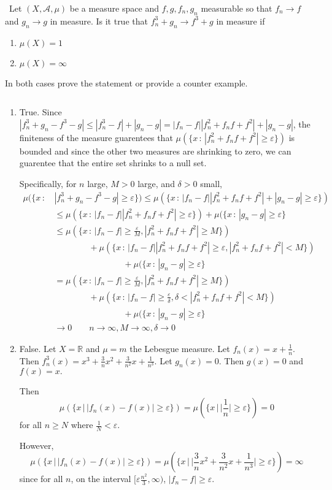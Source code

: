 \documentclass[12pt]{Qual}
\begin{document}
\begin{problem} $\,$
Let $(X,\mathscr{A},\mu)$ be a measure space and $f,g,f_n,g_n$ measurable so that $f_n\to f$ and $g_n\to g$ in measure. Is it true that $f_n^3+g_n\to f^3+g$ in measure if \begin{enumerate}[label=(\alph*)]
    \item $\mu(X)=1$
    \item $\mu(X)=\infty$
\end{enumerate}
In both cases prove the statement or provide a counter example.
\end{problem}


\begin{solution}$\,$
\begin{enumerate}[label=(\alph*)]
    \item True. Since $|f_n^3+g_n-f^3-g|\le |f_n^3-f|+|g_n-g|=|f_n-f||f_n^2+f_nf+f^2|+|g_n-g|$, the finiteness of the measure guarentees that $\mu(\{x\,:\,|f_n^2+f_nf+f^2|\ge\varepsilon\})$ is bounded and since the other two measures are shrinking to zero, we can guarentee that the entire set shrinks to a null set.

    Specifically, for $n$ large, $M>0$ large, and $\delta>0$ small, \begin{align*}
        \mu(\{x\,:\,&|f_n^3+g_n-f^3-g|\ge\varepsilon\})\le\mu(\{x\,:\,|f_n-f||f_n^2+f_nf+f^2|+|g_n-g|\ge\varepsilon\})\\
        &\le \mu(\{x\,:\,|f_n-f||f_n^2+f_nf+f^2|\ge\varepsilon\})+\mu(\{x\,:\,|g_n-g|\ge\varepsilon\}\\
        &\le \mu(\{x\,:\,|f_n-f|\ge\frac{\varepsilon}{M}, |f_n^2+f_nf+f^2|\ge M\})\\
        &\qquad\qquad+\mu(\{x\,:\,|f_n-f||f_n^2+f_nf+f^2|\ge\varepsilon,|f_n^2+f_nf+f^2|<M\})\\
        &\qquad\qquad\qquad\qquad+\mu(\{x\,:\,|g_n-g|\ge\varepsilon\}\\
        &=\mu(\{x\,:\,|f_n-f|\ge\frac{\varepsilon}{M},|f_n^2+f_nf+f^2|\ge M\})\\
        &\qquad\qquad+\mu(\{x\,:\,|f_n-f|\ge\frac{\varepsilon}{\delta},\delta<|f_n^2+f_nf+f^2|<M\})\\
        &\qquad\qquad\qquad\qquad+\mu(\{x\,:\,|g_n-g|\ge\varepsilon\}\\
        &\to 0\qquad n\to\infty, M\to\infty,\delta\to0
    \end{align*}
    \item False. Let $X=\mathbb{R}$ and $\mu=m$ the Lebesgue measure. Let $f_n(x)=x+\frac{1}{n}$. Then $f_n^3(x)=x^3+\frac{3}{n}x^2+\frac{3}{n^2}x+\frac{1}{n^3}$. Let $g_n(x)=0$. Then $g(x)=0$ and $f(x)=x.$

    Then $$\mu(\{x\,|\,|f_n(x)-f(x)|\ge\varepsilon\})=\mu(\{x\,|\,|\frac{1}{n}|\ge\varepsilon\})=0$$ for all $n\ge N$ where $\frac{1}{N}<\varepsilon$.

    However, $$\mu(\{x\,|\,|f_n(x)-f(x)|\ge\varepsilon\})=\mu(\{x\,|\,|\frac{3}{n}x^2+\frac{3}{n^2}x+\frac{1}{n^3}|\ge\varepsilon\})=\infty$$ since for all $n$, on the interval $[\varepsilon \frac{n^2}{3},\infty)$, $|f_n-f|\ge\varepsilon$.
\end{enumerate}
\end{solution}
\newpage
\end{document}
